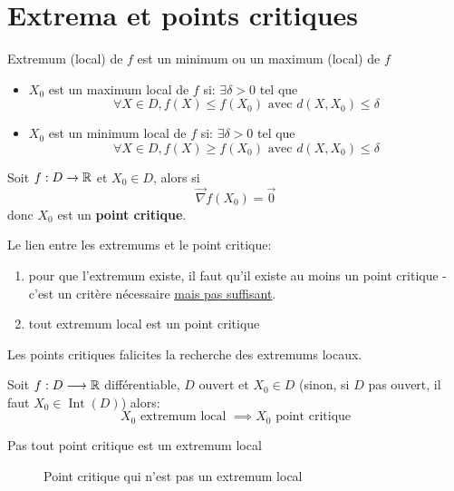 \section{Extrema et points critiques}
\begin{definition}
    Extremum (local) de $f$ est un minimum ou un maximum (local) de  $f$
    \begin{itemize}
        \item $X_0$ est un maximum local de $f$ si: $\exists \delta > 0$ tel que
            \[
            \forall X \in D, f(X) \le f(X_0) \text{ avec } d(X, X_0) \le \delta
            \] 
        \item $X_0$ est un minimum local de $f$ si: $\exists \delta > 0$ tel que
            \[
            \forall X \in D, f(X) \ge f(X_0) \text{ avec } d(X, X_0) \le \delta
            \] 
    \end{itemize}
\end{definition}

\begin{definition}
    Soit $f: D \to \mathbb{R}$ et $X_0 \in D$, alors si
     \[
         \vec{\nabla}f(X_0) = \vec{0}
    \] 
    donc $X_0$ est un \textbf{point critique}.
\end{definition}
\begin{intuition}
   Le lien entre les extremums et le point critique: 
   \begin{enumerate}
       \item pour que l'extremum existe, il faut qu'il existe au moins un point critique - c'est un critère nécessaire \underline{mais pas suffisant}.
       \item tout extremum local est un point critique
   \end{enumerate}
   Les points critiques falicites la recherche des extremums locaux.
\end{intuition}

\begin{theorem}
    Soit $f: D \longrightarrow \mathbb{R}$ différentiable, $D$ ouvert et  $X_0 \in D$ (sinon, si $D$ pas ouvert, il faut  $X_0 \in \operatorname{Int}(D)$) alors:
    \[
        X_0 \text{ extremum local } \implies X_0 \text{ point critique} 
    \] 
\end{theorem}

\begin{eg} Pas tout point critique est un extremum local
\begin{figure}[H]
    \centering
    \caption{Point critique qui n'est pas un extremum local}
    \label{fig:point-critique-nestpas-extremum-local}
\end{figure}
\end{eg}

